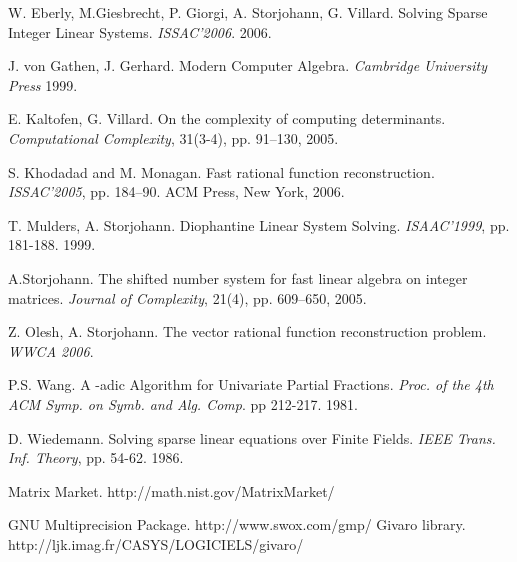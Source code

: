 \documentclass{acm_proc_article-sp}   \usepackage{graphicx,url}
\begin{document}
\begin{thebibliography}{99}
 W. Eberly, M.Giesbrecht, P. Giorgi,
A. Storjohann, G. Villard. Solving Sparse Integer Linear Systems. {\em
ISSAC'2006}. 2006.

 J. von Gathen, J. Gerhard. Modern Computer Algebra. {\em Cambridge University Press} 1999.





 E. Kaltofen, G. Villard. On the complexity of
computing determinants. {\em Computational Complexity}, 31(3-4), pp.
91--130, 2005.

 S. Khodadad and M. Monagan. Fast rational function reconstruction.
{\em ISSAC'2005}, pp. 184--90. ACM Press, New York, 2006.

 T. Mulders, A. Storjohann. Diophantine Linear
System Solving. {\em ISAAC'1999}, pp. 181-188. 1999.







 A.Storjohann. The shifted number system for
fast linear algebra on integer matrices. {\em Journal of Complexity}, 21(4),
pp. 609--650, 2005.



 Z. Olesh, A. Storjohann. The vector rational function reconstruction problem. {\em WWCA 2006}.



 P.S. Wang. A -adic Algorithm for Univariate Partial Fractions. {\em Proc. of the 4th ACM Symp. on Symb. and Alg. Comp}. pp 212-217. 1981.

 D. Wiedemann. Solving sparse linear equations over Finite Fields. {\em IEEE Trans. Inf. Theory}, pp. 54-62. 1986.

 Matrix Market.
http://math.nist.gov/MatrixMarket/

 GNU Multiprecision Package.
http://www.swox.com/gmp/
 Givaro library.
http://ljk.imag.fr/CASYS/LOGICIELS/givaro/



\end{thebibliography}
\end{document}
